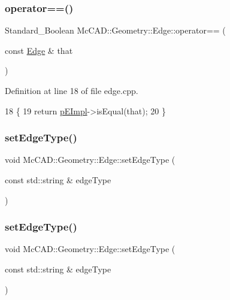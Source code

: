 \subsubsection{\texorpdfstring{operator==()}{operator==()}\hspace{0.1cm}{\footnotesize\ttfamily [2/2]}}
{\footnotesize\ttfamily Standard\+\_\+\+Boolean Mc\+C\+A\+D\+::\+Geometry\+::\+Edge\+::operator== (\begin{DoxyParamCaption}\item[{const \hyperlink{classMcCAD_1_1Geometry_1_1Edge}{Edge} \&}]{that }\end{DoxyParamCaption})}



Definition at line 18 of file edge.\+cpp.


\begin{DoxyCode}
18                                                             \{
19   \textcolor{keywordflow}{return} \hyperlink{classMcCAD_1_1Geometry_1_1Edge_aefb1a25627999c87d4984bb505550626}{pEImpl}->isEqual(that);
20 \}
\end{DoxyCode}
\mbox{\label{classMcCAD_1_1Geometry_1_1Edge_a3484c314c0b6f06116436923f16f99fe}} 
\subsubsection{\texorpdfstring{set\+Edge\+Type()}{setEdgeType()}\hspace{0.1cm}{\footnotesize\ttfamily [1/2]}}
{\footnotesize\ttfamily void Mc\+C\+A\+D\+::\+Geometry\+::\+Edge\+::set\+Edge\+Type (\begin{DoxyParamCaption}\item[{const std\+::string \&}]{edge\+Type }\end{DoxyParamCaption})}

\mbox{\label{classMcCAD_1_1Geometry_1_1Edge_a3484c314c0b6f06116436923f16f99fe}} 
\subsubsection{\texorpdfstring{set\+Edge\+Type()}{setEdgeType()}\hspace{0.1cm}{\footnotesize\ttfamily [2/2]}}
{\footnotesize\ttfamily void Mc\+C\+A\+D\+::\+Geometry\+::\+Edge\+::set\+Edge\+Type (\begin{DoxyParamCaption}\item[{const std\+::string \&}]{edge\+Type }\end{DoxyParamCaption})}




